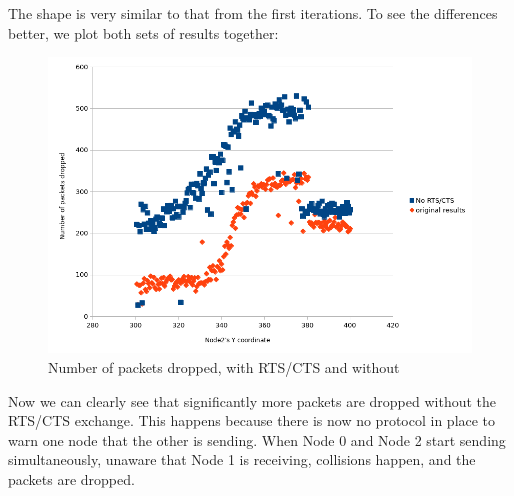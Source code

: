 \documentclass[11pt,journal]{article}
\begin{document}
	The shape is very similar to that from the first iterations. To see the differences better, we plot both sets of results together:
	
	\begin{figure}[h]
		\centering
		\includegraphics[scale=0.8]{graph5.png}
		\caption{Number of packets dropped, with RTS/CTS and without}
	\end{figure}

	Now we can clearly see that significantly more packets are dropped without the RTS/CTS exchange. This happens because there is now no protocol in place to warn one node that the other is sending. When Node 0 and Node 2 start sending simultaneously, unaware that Node 1 is receiving, collisions happen, and the packets are dropped. 
	
	
	
	
	

	
\end{document}
